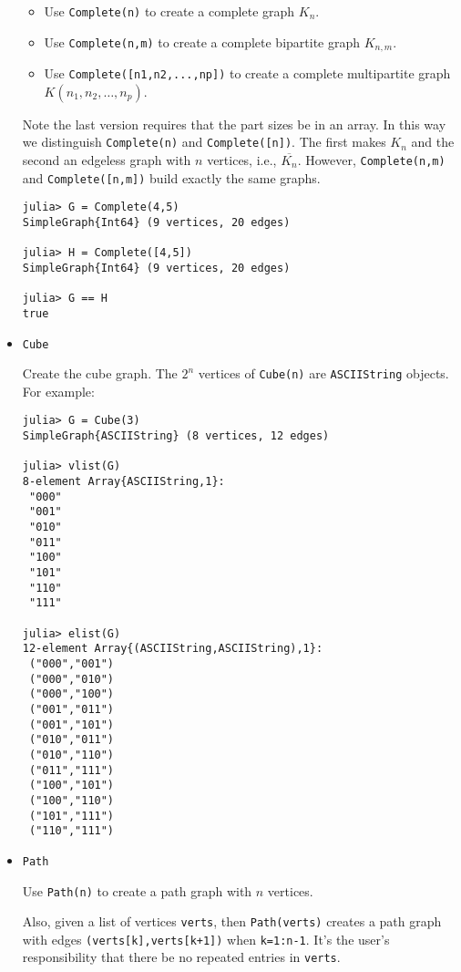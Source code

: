 \documentclass[oneside]{amsart}
\begin{document}
\begin{itemize}
    \begin{itemize}
    \item Use \verb|Complete(n)| to create a complete graph $K_n$.

    \item Use \verb|Complete(n,m)| to create a complete bipartite
      graph $K_{n,m}$.


    \item Use \verb|Complete([n1,n2,...,np])| to create a complete
      multipartite graph $K(n_1,n_2,\ldots,n_p)$.
    \end{itemize}

    Note the last version requires that the part sizes be in an
    array. In this way we distinguish \verb|Complete(n)| and
    \verb|Complete([n])|. The first makes $K_n$ and the second an
    edgeless graph with $n$ vertices, i.e., $\overline{K_n}$.
    However, \verb|Complete(n,m)| and \verb|Complete([n,m])| build
    exactly the same graphs.
    \small
\begin{verbatim}
julia> G = Complete(4,5)
SimpleGraph{Int64} (9 vertices, 20 edges)

julia> H = Complete([4,5])
SimpleGraph{Int64} (9 vertices, 20 edges)

julia> G == H
true
\end{verbatim}
\normalsize

  \item \verb|Cube|

    Create the cube graph. The $2^n$ vertices of \verb|Cube(n)| are
    \verb|ASCIIString| objects. For example:
\small
\begin{verbatim}
julia> G = Cube(3)
SimpleGraph{ASCIIString} (8 vertices, 12 edges)

julia> vlist(G)
8-element Array{ASCIIString,1}:
 "000"
 "001"
 "010"
 "011"
 "100"
 "101"
 "110"
 "111"

julia> elist(G)
12-element Array{(ASCIIString,ASCIIString),1}:
 ("000","001")
 ("000","010")
 ("000","100")
 ("001","011")
 ("001","101")
 ("010","011")
 ("010","110")
 ("011","111")
 ("100","101")
 ("100","110")
 ("101","111")
 ("110","111")
\end{verbatim}
\normalsize


\item \verb|Path|

  Use \verb|Path(n)| to create a path graph with $n$ vertices.

  Also, given a list of vertices \verb|verts|, then \verb|Path(verts)|
  creates a path graph with edges \verb|(verts[k],verts[k+1])| when
  \verb|k=1:n-1|. It's the user's responsibility that there be no
  repeated entries in \verb|verts|.


\end{itemize}
\end{document}
